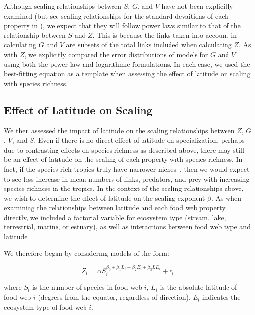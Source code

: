 \documentclass[12pt]{article}
\begin{document}
Although scaling relationships between $S$, $G$, and $V$ have not been explicitly examined (but see scaling 
relationships for the standard devaitions of each property in \citet{Riede2010}), we expect that they will follow
power laws similar to that of the relationship between $S$ and $Z$. This is because the links taken into account in
calculating $G$ and $V$ are subsets of the total links included when calculating $Z$. As with $Z$, we explicitly 
compared the error distributions of models for $G$ and $V$ using both the power-law and logarithmic formulations. 
In each case, we used the best-fitting equation as a template when assessing the effect of latitude on scaling with
species richness.



\subsection*{Effect of Latitude on Scaling}



We then assessed the impact of latitude on the scaling relationships between $Z$, $G$, $V$, and $S$. 
Even if there is no direct effect of latitude on specialization, perhaps due to contrasting effects
on species richness as described above, there may still be an effect of latitude on the scaling of
each property with species richness. In fact, if the species-rich tropics truly have narrower 
niches~\citep{Brown2004}, then we would expect to see less increase in mean numbers of links, 
predators, and prey with increasing species richness in the tropics.
In the context of the scaling relationships above, we wish to determine the effect of latitude on
the scaling exponent $\beta$. As when examining the relationships between latitude and each food 
web property directly, we included a factorial variable for ecosystem type (stream, lake, 
terrestrial, marine, or estuary), as well as interactions between food web type and latitude.


We therefore began by considering models of the form:

\begin{equation}
\label{PowerLat}
Z_{i}=\alpha S_{i}^{\beta_{0}+\beta_{1}L_{i}+\beta_{2}E_{i}+\beta_{3}LE_{i}} + \epsilon_{i} 
\end{equation}

where $S_{i}$ is the number of species in food web $i$, $L_{i}$ is the absolute latitude of food web $i$ (degrees from the equator, regardless of direction),
$E_{i}$ indicates the ecosystem type of food web $i$.
\end{document}
